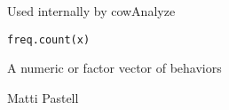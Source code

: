 \begin{Description}\relax
Used internally by cowAnalyze
\end{Description}
\begin{Usage}
\begin{verbatim}
freq.count(x)
\end{verbatim}
\end{Usage}
\begin{Arguments}
\begin{ldescription}
\item[\code{x}] A numeric or factor vector of behaviors
\end{ldescription}
\end{Arguments}
\begin{Author}\relax
Matti Pastell
\end{Author}

